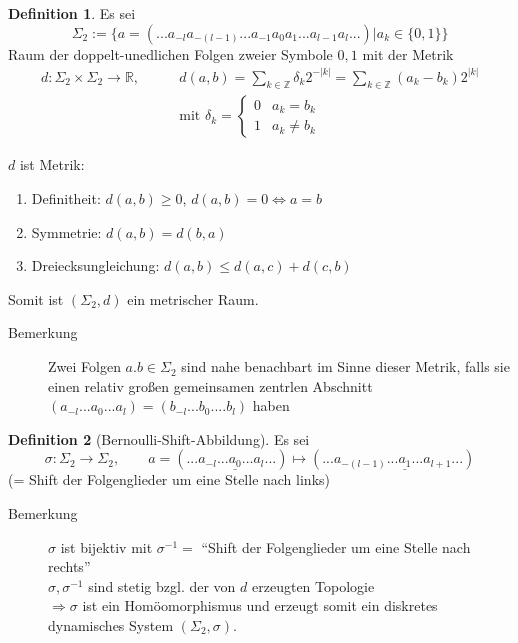 \documentclass[a4paper, 13pt]{scrreprt}
\theoremstyle{definition} \newtheorem{definition}{Definition}[section]
\begin{document}
\begin{definition}
Es sei 
	\[\Sigma_2 := \{a = (...a_{-l}a_{-(l-1)}...a_{-1}a_0a_1...a_{l-1}a_l...) | a_k \in \{0,1\}\} \]
	Raum der doppelt-unedlichen Folgen zweier Symbole \(0,1\) mit der Metrik 
		\begin{align*}d: \Sigma_2\times\Sigma_2 \to \mathbb{R}, \qquad
		&d(a,b)= \sum_{k \in\mathbb{Z}} \delta_k2^{-|k|} = \sum_{k\in \mathbb{Z}} (a_k-b_k)2^{|k|} \\
		&\text{mit } \delta_k = \begin{cases} 0 & a_k=b_k \\ 1 & a_k\not= b_k \end{cases}
		\end{align*}
\end{definition}
\(d\) ist Metrik:
\begin{enumerate}
	\item Definitheit: \(d(a,b) \geq 0\), \(d(a,b) = 0 \Leftrightarrow a=b\)
	\item Symmetrie: \(d(a,b)= d(b,a)\)
	\item Dreiecksungleichung: \(d(a,b) \leq d(a,c) + d(c,b)\)
\end{enumerate}
Somit ist \((\Sigma_2, d)\) ein metrischer Raum.

\begin{description}
	\item[Bemerkung] Zwei Folgen \(a.b \in \Sigma_2\) sind nahe benachbart im Sinne dieser Metrik, falls sie einen relativ großen gemeinsamen zentrlen Abschnitt \((a_{-l}...a_0...a_l) = (b_{-l}...b_0....b_l)\) haben
\end{description}

\begin{definition}[Bernoulli-Shift-Abbildung]
Es sei 
	\[\sigma:\Sigma_2 \to \Sigma_2, \qquad a=(...a_{-l}...\underline{a_0}...a_l...) \mapsto (...a_{-(l-1)}...\underline{a_1}...a_{l+1}...) \]
(= Shift der Folgenglieder um eine Stelle nach links)

\end{definition}

\begin{description}
	\item[Bemerkung] \(\sigma\) ist bijektiv mit \(\sigma^{-1}= \) "`Shift der Folgenglieder um eine Stelle nach rechts"'\\
	\(\sigma,\sigma^{-1}\) sind stetig bzgl. der von \(d\) erzeugten Topologie\\
	\(\Rightarrow \sigma\) ist ein Homöomorphismus und erzeugt somit ein diskretes dynamisches System \((\Sigma_2,\sigma)\).
\end{description}
\end{document}

